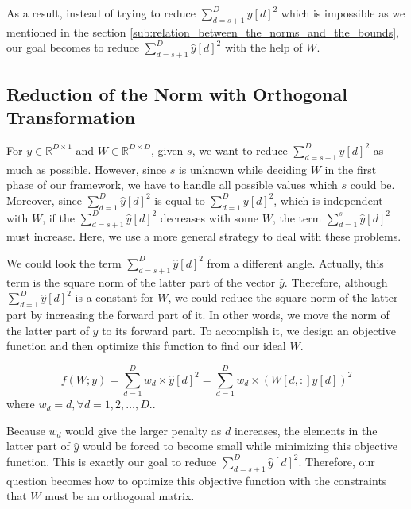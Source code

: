 As a result, instead of trying to reduce $\sum^D_{d=s+1}{y[d]^2}$ which is impossible as we mentioned in the section \ref{sub:relation_between_the_norms_and_the_bounds}, our goal becomes to reduce $\sum^D_{d=s+1}{\hat{y}[d]^2}$ with the help of $W$.


\subsection{Reduction of the Norm with Orthogonal Transformation} %
\label{ss:reduce_the_norm_with_orthogonal_transformation}

For $y\in \mathbb{R}^{D\times 1}$ and $W\in\mathbb{R}^{D\times D}$, given $s$, we want to reduce $\sum^D_{d=s+1}{\hat{y}[d]^2}$ as much as possible.  However, since $s$ is unknown while deciding $W$ in the first phase of our framework, we have to handle all possible values which $s$ could be.  Moreover, since $\sum^D_{d=1}{\hat{y}[d]^2}$ is equal to $\sum^D_{d=1}{y[d]^2}$, which is independent with $W$, if the $\sum^D_{d=s+1}{\hat{y}[d]^2}$ decreases with some $W$, the term $\sum^s_{d=1}{\hat{y}[d]^2}$ must increase.  Here, we use a more general strategy to deal with these problems.

We could look the term $\sum^D_{d=s+1}{\hat{y}[d]^2}$ from a different angle.  Actually, this term is the square norm of the latter part of the vector $\hat{y}$. Therefore, although $\sum^D_{d=1}{\hat{y}[d]^2}$ is a constant for $W$, we could reduce the square norm of the latter part by increasing the forward part of it.  In other words, we move the norm of the latter part of $y$ to its forward part.  To accomplish it, we design an objective function and then optimize this function to find our ideal $W$.

\begin{equation}\label{objective}
	f(W;y)=\sum^D_{d=1}{w_d\times\hat{y}[d]^2}=\sum^D_{d=1}{w_d\times(W[d,:]y[d])^2}
\end{equation}
where $w_d=d,  \forall d=1,2,\ldots,D.$.

Because $w_d$ would give the larger penalty as $d$ increases, the elements in the latter part of $\hat{y}$ would be forced to become small while minimizing this objective function.  This is exactly our goal to reduce $\sum^D_{d=s+1}{\hat{y}[d]^2}$.  Therefore, our question becomes how to optimize this objective function with the constraints that $W$ must be an orthogonal matrix.


